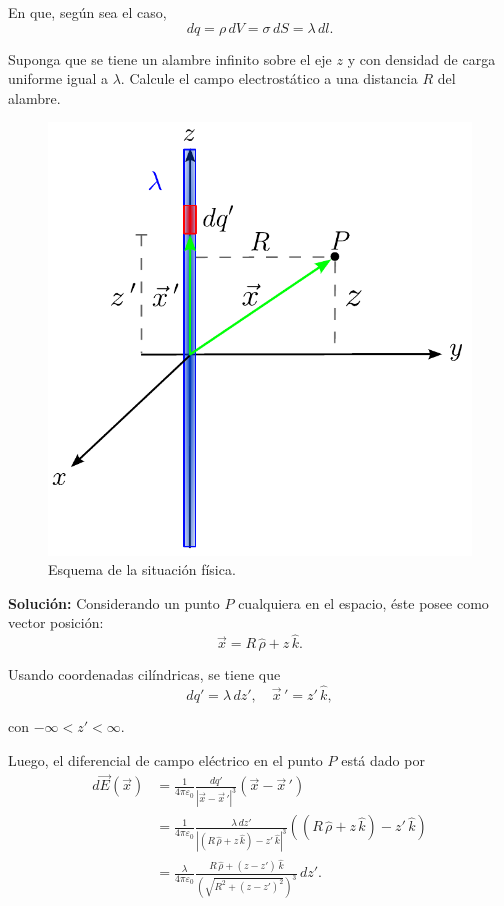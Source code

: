 En que, según sea el caso,
\begin{equation*}
dq = \rho \,dV = \sigma \,dS = \lambda \,dl.
\end{equation*}

\begin{ejemplo}
    Suponga que se tiene un alambre infinito sobre el eje $z$ y con densidad de carga uniforme igual a $\lambda$. Calcule el campo electrostático a una distancia $R$ del alambre.

\begin{figure}[H]
    \centering
    \includegraphics[scale = 0.6]{Figuras/Ej-E-Alambre-Infinito.pdf}
    \caption{Esquema de la situación física.}
    \label{fig:Ej-E-Alambre-Infinito}
\end{figure}

\textbf{Solución:} Considerando un punto $P$ cualquiera en el espacio, éste posee como vector posición:
$$\Vec{x} = R \,\hat{\rho} + z \, \hat{k}.$$

Usando coordenadas cilíndricas, se tiene que
$$dq' = \lambda \,dz', \quad \Vec{x}\,' = z' \,\hat{k},$$

con $- \infty < z' < \infty$.

Luego, el diferencial de campo eléctrico en el punto $P$ está dado por
\begin{align*}
    d \vec{E}(\vec{x}) &= \frac{1}{4\pi \varepsilon_0} \frac{dq'}{|\vec{x} - \vec{x}\,'|^3} (\vec{x} - \vec{x}\,')  \\
&= \frac{1}{4\pi \varepsilon_0} \frac{\lambda \,dz'}{|(R \,\hat{\rho} + z\, \hat{k}) - z' \,\hat{k}|^3} ((R \,\hat{\rho} + z \,\hat{k}) -z'\,\hat{k}) \\
&= \frac{\lambda}{4\pi \varepsilon_0} \frac{R \,\hat{\rho} + (z-z')\, \hat{k}}{(\sqrt{R^2 + (z-z')^2})^3} \,dz'.
\end{align*}


\end{ejemplo}
